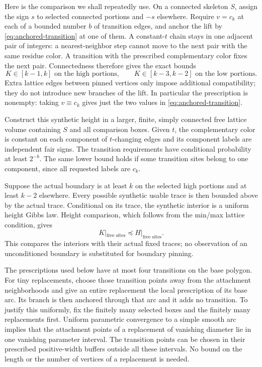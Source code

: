 Here is the comparison we shall repeatedly use.  On a connected skeleton
$S$, assign the sign $s$ to selected connected portions and $-s$ elsewhere.
Require $v=c_k$ at each of a bounded number $b$ of transition edges, and
anchor the lift by \eqref{eq:anchored-transition} at one of them.  A
constant-$t$ chain stays in one adjacent pair of integers: a nearest-neighbor
step cannot move to the next pair with the same residue color.  A transition
with the prescribed complementary color fixes the next pair.  Connectedness
therefore gives the exact bounds
\begin{equation}\label{eq:synthetic-intervals}
 K\in[k-1,k]\text{ on the high portions},\qquad
 K\in[k-3,k-2]\text{ on the low portions}.
\end{equation}
Extra lattice edges between pinned vertices only impose additional
compatibility; they do not introduce new branches of the lift.  In
particular the prescription is nonempty: taking $v\equiv c_k$ gives just
the two values in \eqref{eq:anchored-transition}.

Construct this synthetic height in a larger, finite, simply connected free
lattice volume containing $S$ and all comparison boxes.  Given $t$, the
complementary color is constant on each component of $t$-changing edges and
its component labels are independent fair signs.  The transition
requirements have conditional probability at least $2^{-b}$.  The same
lower bound holds if some transition sites belong to one component, since
all requested labels are $c_k$.

Suppose the actual boundary is at least $k$ on the selected high portions
and at least $k-2$ elsewhere.  Every possible synthetic usable trace is then
bounded above by the actual trace.  Conditional on its trace, the synthetic
interior is a uniform height Gibbs law.  Height comparison, which follows
from the min/max lattice condition, gives
\begin{equation}\label{eq:synthetic-height-domination}
       K|_{\text{free sites}}\preceq H|_{\text{free sites}}.
\end{equation}
This compares the interiors with their actual fixed traces; no observation
of an unconditioned boundary is substituted for boundary pinning.

The prescriptions used below have at most four transitions on the base
polygon.  For tiny replacements, choose those transition points away from
the attachment neighborhoods and give an entire replacement the local
prescription of its base arc.  Its branch is then anchored through that arc
and it adds no transition.  To justify this uniformly, fix the finitely many
selected boxes and the finitely many replacements first.  Uniform
parametric convergence to a simple smooth arc implies that the attachment
points of a replacement of vanishing diameter lie in one vanishing
parameter interval.  The transition points can be chosen in their prescribed
positive-width buffers outside all these intervals.  No bound on the length
or the number of vertices of a replacement is needed.

